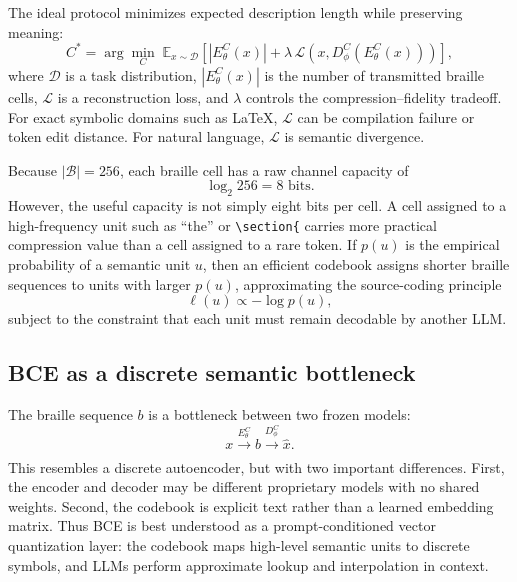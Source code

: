 \documentclass[11pt]{article}
\begin{document}
The ideal protocol minimizes expected description length while preserving meaning:
\begin{equation}
  C^{*} = \arg\min_{C} \; \mathbb{E}_{x \sim \mathcal{D}}
  \left[
    |E_{\theta}^{C}(x)| + \lambda \, \mathcal{L}\left(x, D_{\phi}^{C}(E_{\theta}^{C}(x))\right)
  \right],
  \label{eq:codebook-objective}
\end{equation}
where $\mathcal{D}$ is a task distribution, $|E_{\theta}^{C}(x)|$ is the number of transmitted braille cells, $\mathcal{L}$ is a reconstruction loss, and $\lambda$ controls the compression--fidelity tradeoff. For exact symbolic domains such as LaTeX, $\mathcal{L}$ can be compilation failure or token edit distance. For natural language, $\mathcal{L}$ is semantic divergence.

Because $|\mathcal{B}| = 256$, each braille cell has a raw channel capacity of
\begin{equation}
  \log_{2} 256 = 8 \text{ bits}.
\end{equation}
However, the useful capacity is not simply eight bits per cell. A cell assigned to a high-frequency unit such as ``the'' or \verb|\section{| carries more practical compression value than a cell assigned to a rare token. If $p(u)$ is the empirical probability of a semantic unit $u$, then an efficient codebook assigns shorter braille sequences to units with larger $p(u)$, approximating the source-coding principle
\begin{equation}
  \ell(u) \propto -\log p(u),
\end{equation}
subject to the constraint that each unit must remain decodable by another LLM.

\subsection{BCE as a discrete semantic bottleneck}
The braille sequence $b$ is a bottleneck between two frozen models:
\begin{equation}
  x \xrightarrow[]{E_{\theta}^{C}} b \xrightarrow[]{D_{\phi}^{C}} \hat{x}.
\end{equation}
This resembles a discrete autoencoder, but with two important differences. First, the encoder and decoder may be different proprietary models with no shared weights. Second, the codebook is explicit text rather than a learned embedding matrix. Thus BCE is best understood as a prompt-conditioned vector quantization layer: the codebook maps high-level semantic units to discrete symbols, and LLMs perform approximate lookup and interpolation in context.
\end{document}
